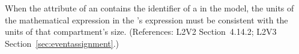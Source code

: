 When the  attribute of an \EventAssignment
contains the identifier of a \Compartment in the model, the
units of the mathematical expression in the
\EventAssignment's  expression must be
consistent with the units of that compartment's size.
(References: L2V2 Section~4.14.2; L2V3 Section~\ref{sec:eventassignment}.)
